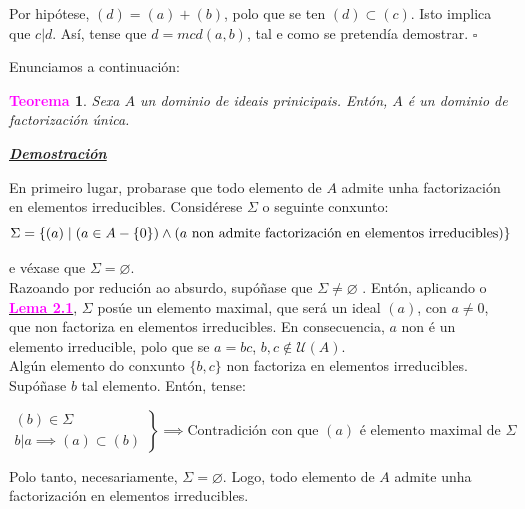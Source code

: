 \documentclass[twoside]{report}
\newcommand{\magbf}[1]{\textcolor{magenta}{\textbf{#1}}} %
\theoremstyle{mystyle}
\newtheorem{theo}{\magbf{Teorema}}[chapter]
\newenvironment{theorem}
{\begin{mdframed}[linecolor = magenta,backgroundcolor = classicrose, linewidth = 2mm]\begin{theo}}
{\end{theo}\end{mdframed}}
\begin{document}
\noindent Por hipótese, $(d) = (a) + (b)$, polo que se ten $(d) \subset (c)$. Isto implica que $c|d$. Así, tense que $d = mcd(a,b)$, tal e como se pretendía demostrar. $\square$

\pagebreak

\noindent Enunciamos a continuación:\\

\begin{theorem} \label{th2.6}
Sexa $A$ un dominio de ideais prinicipais. Entón, $A$ é un dominio de factorización única.
\end{theorem}

\vspace{2mm}

\noindent \textbf{\textit{\underline{Demostración}}}

\vspace{2mm}

\noindent En primeiro lugar, probarase que todo elemento de $A$ admite unha factorización en elementos irreducibles. Considérese $\Sigma$ o seguinte conxunto:
$$\Sigma = \{(a) \hspace{1mm} | \hspace{1mm} (a \in A-\{0\})\wedge (a \text{ non admite factorización en elementos irreducibles})\}$$

\noindent e véxase que $\Sigma = \varnothing$.\\

\noindent Razoando por redución ao absurdo, supóñase que $\Sigma \neq \varnothing$ . Entón, aplicando o \hyperref[lem2.1]{\magbf{Lema 2.1}}, $\Sigma$ posúe un elemento maximal, que será un ideal $(a)$, con $a \neq 0$, que non factoriza en elementos irreducibles. En consecuencia, $a$ non é un elemento irreducible, polo que se $a = bc$, $b,c \notin \mathcal{U}(A)$.\\

\noindent Algún elemento do conxunto $\{b,c\}$ non factoriza en elementos irreducibles. Supóñase $b$ tal elemento. Entón, tense:

    \[ 
    \left. \begin{array}{r} 
    (b) \in \Sigma \\[1ex]
    b|a \implies (a) \subset (b)
    \end{array} \right\}
    \implies \text{Contradición con que }(a) \text{ é elemento maximal de }\Sigma
    \]
    
\noindent Polo tanto, necesariamente, $\Sigma = \varnothing$. Logo, todo elemento de $A$ admite unha factorización en elementos irreducibles.\\
\end{document}
